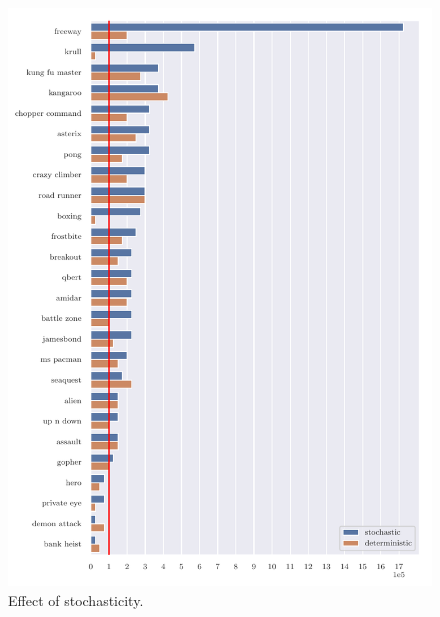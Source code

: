 \begin{figure}
\centering
\includegraphics[width=0.9\columnwidth]{figures/graph_Effect_of_stochasticity.pdf}
\caption{Effect of stochasticity.} 
\label{fig:effects_stocha}
\end{figure}

